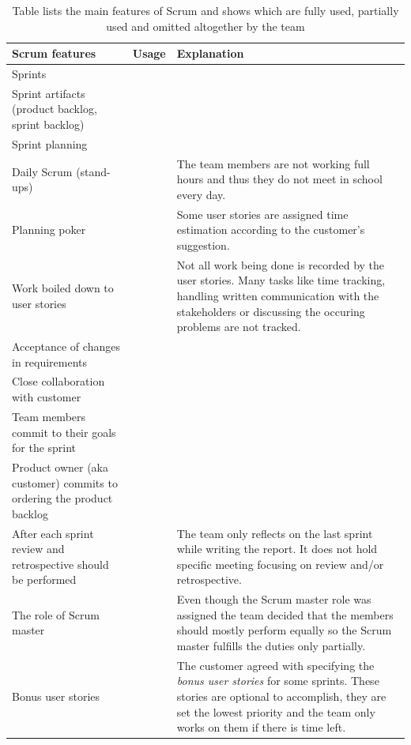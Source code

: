 \begin{table}[!h]
	\begin{center}
	\caption{Table lists the main features of Scrum and shows which are fully used, partially used and omitted altogether by the team}
	\label{tab:scrumbut}
	\def\arraystretch{1.3}
		\begin{tabularx}{0.9\textwidth}{ X c X }
		\toprule[0.5mm]
		\textbf{Scrum features} & \textbf{Usage} & \textbf{Explanation} \\
		\midrule
		Sprints 											& \tick			& 	 	\\
		Sprint artifacts (product backlog, sprint backlog)	& \tick			& 	 	\\
		Sprint planning 									& \tick			& 	 	\\
		Daily Scrum (stand-ups)								& \tickorange	& The team members are not working full hours and thus they do not meet in school every day. \\
		Planning poker 										& \tickorange 	& Some user stories are assigned time estimation according to the customer's suggestion.		\\
		Work boiled down to user stories 					& \tickorange   & Not all work being done is recorded by the user stories. Many tasks like time tracking, handling written communication with the stakeholders or discussing the occuring problems are not tracked. \\
		Acceptance of changes in requirements				& \tick 		& 		\\
		Close collaboration with customer					& \tick 		& 		\\
		Team members commit to their goals for the sprint	& \tick 		& 		\\
		Product owner (aka customer) commits to ordering the product backlog & \tick & \\
		After each sprint review and retrospective should be performed & \cross & The team only reflects on the last sprint while writing the report. It does not hold specific meeting focusing on review and/or retrospective. \\
		The role of Scrum master							& \cross 		& Even though the Scrum master role was assigned the team decided that the members should mostly perform equally so the Scrum master fulfills the duties only partially. \\
		\midrule
		Bonus user stories									& \plus			& The customer agreed with specifying the \textit{bonus user stories} for some sprints. These stories are optional to accomplish, they are set the lowest priority and the team only works on them if there is time left. \\
		\bottomrule[0.5mm]
		\end{tabularx}
	\end{center}
\end{table}

